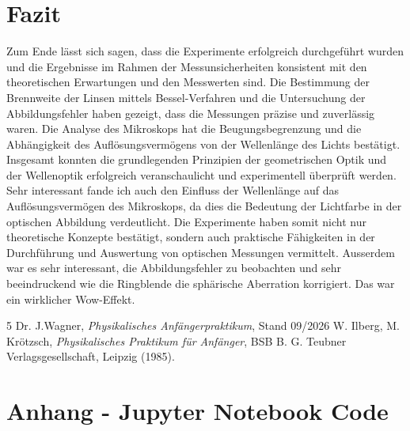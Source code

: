 \documentclass[12pt,a4paper,titlepage]{scrartcl}
\numberwithin{equation}{section}
\numberwithin{table}{section}
\numberwithin{figure}{section}
\begin{document}
\section{Fazit}
Zum Ende lässt sich sagen, dass die Experimente erfolgreich durchgeführt wurden und die Ergebnisse im Rahmen der Messunsicherheiten konsistent mit den theoretischen Erwartungen und den Messwerten sind. Die Bestimmung der Brennweite der Linsen mittels Bessel-Verfahren und die Untersuchung der Abbildungsfehler haben gezeigt, dass die Messungen präzise und zuverlässig waren. Die Analyse des Mikroskops hat die Beugungsbegrenzung und die Abhängigkeit des Auflösungsvermögens von der Wellenlänge des Lichts bestätigt. Insgesamt konnten die grundlegenden Prinzipien der geometrischen Optik und der Wellenoptik erfolgreich veranschaulicht und experimentell überprüft werden. Sehr interessant fande ich auch den Einfluss der Wellenlänge auf das Auflösungsvermögen des Mikroskops, da dies die Bedeutung der Lichtfarbe in der optischen Abbildung verdeutlicht. Die Experimente haben somit nicht nur theoretische Konzepte bestätigt, sondern auch praktische Fähigkeiten in der Durchführung und Auswertung von optischen Messungen vermittelt. Ausserdem war es sehr interessant, die Abbildungsfehler zu beobachten und sehr beeindruckend wie die Ringblende die sphärische Aberration korrigiert. Das war ein wirklicher Wow-Effekt.

\clearpage

\listoffigures

\listoftables

\begin{thebibliography}{5}
     Dr. J.Wagner, \emph{Physikalisches Anfängerpraktikum}, Stand 09/2026
     W. Ilberg, M. Krötzsch, \emph{Physikalisches Praktikum für Anfänger}, BSB B. G. Teubner Verlagsgesellschaft, Leipzig (1985).
\end{thebibliography}

\section{Anhang - Jupyter Notebook Code}


\end{document}

